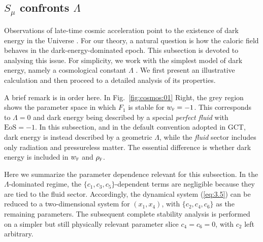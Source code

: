 \documentclass[aps,prd,twocolumn]{revtex4-2}
\newcommand\subF{\textsc{f}}
\begin{document}
\subsection{$S_\mu$ confronts $\Lambda$}\label{sec:III.B}
Observations of late-time cosmic acceleration point to the existence of dark energy in the Universe \cite{Riess1998.AstronJ.116.1009,Perlmutter1999.ApJ.517.565}. For our theory, a natural question is how the caloric field behaves in the dark-energy-dominated epoch. This subsection is devoted to analysing this issue. For simplicity, we work with the simplest model of dark energy, namely a cosmological constant $\Lambda$ \cite{Einstein1917.NotEngJ.1917.142}. We first present an illustrative calculation and then proceed to a detailed analysis of its properties.

A brief remark is in order here. In Fig.~\ref{fig:cosmos:01} Right, the grey region shows the parameter space in which $F_1$ is stable for $w_\subF=-1$. This corresponds to $\Lambda=0$ and dark energy being described by a special \textit{perfect fluid} with $\mathrm{EoS}=-1$. In this subsection, and in the default convention adopted in GCT, dark energy is instead described by a geometric $\Lambda$, while the \textit{fluid} sector includes only radiation and pressureless matter. The essential difference is whether dark energy is included in $w_\subF$ and $\rho_\subF$.

Here we summarize the parameter dependence relevant for this subsection. In the $\Lambda$-dominated regime, the $\{c_1,c_3,c_5\}$-dependent terms are negligible because they are tied to the fluid sector. Accordingly, the dynamical system (\ref{eq:3.5}) can be reduced to a two-dimensional system for $(x_1,x_4)$, with $\{c_2,c_4,c_6\}$ as the remaining parameters. The subsequent complete stability analysis is performed on a simpler but still physically relevant parameter slice $c_4=c_6=0$, with $c_2$ left arbitrary.
\end{document}
